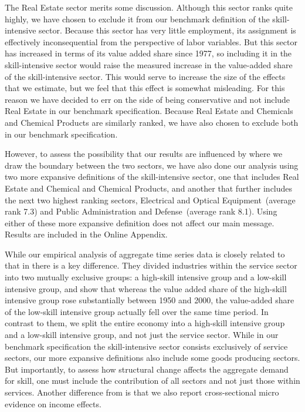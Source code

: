 \documentclass[12pt,english]{article}
\begin{document}
The Real Estate sector merits some discussion. Although this sector ranks
quite highly, we have chosen to exclude it from our benchmark definition of
the skill-intensive sector. Because this sector has very little employment,
its assignment is effectively inconsequential from the perspective of labor
variables. But this sector has increased in terms of its value added share
since 1977, so including it in the skill-intensive sector would raise the
measured increase in the value-added share of the skill-intensive sector.
This would serve to increase the size of the effects that we estimate, but
we feel that this effect is somewhat misleading. For this reason we have
decided to err on the side of being conservative and not include Real Estate
in our benchmark specification. Because Real Estate and Chemicals and
Chemical Products are similarly ranked, we have also chosen to exclude both
in our benchmark specification.

However, to assess the possibility that our results are influenced by where
we draw the boundary between the two sectors, we have also done our analysis
using two more expansive definitions of the skill-intensive sector, one that
includes Real Estate and Chemical and Chemical Products, and another that
further includes the next two highest ranking sectors, Electrical and
Optical Equipment\ (average rank 7.3) and Public Administration and Defense\
(average rank 8.1). Using either of these more expansive definition does not
affect our main message. Results are included in the Online Appendix.

While our empirical analysis of aggregate time series data is closely
related to that in \citet{BueKab12} there is a key difference. They divided
industries within the service sector into two mutually exclusive groups: a
high-skill intensive group and a low-skill intensive group, and show that
whereas the value added share of the high-skill intensive group rose
substantially between 1950 and 2000, the value-added share of the low-skill
intensive group actually fell over the same time period. In contrast to
them, we split the entire economy into a high-skill intensive group and a
low-skill intensive group, and not just the service sector. While in our
benchmark specification the skill-intensive sector consists exclusively of
service sectors, our more expansive definitions also include some goods
producing sectors. But importantly, to assess how structural change affects
the aggregate demand for skill, one must include the contribution of all
sectors and not just those within services. Another difference from %
\citet{BueKab12} is that we also report cross-sectional micro evidence on
income effects.
\end{document}
